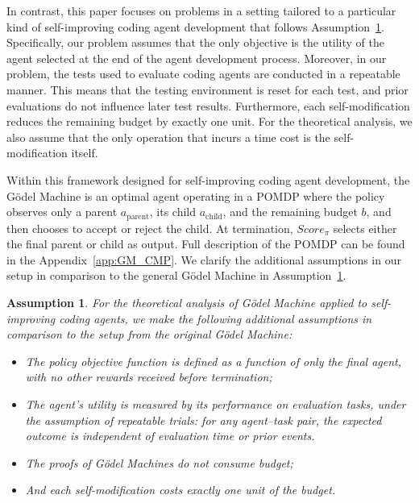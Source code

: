 \documentclass{article}
\newtheorem{assumption}{Assumption}
\begin{document}
In contrast, this paper focuses on problems in a setting tailored to a particular kind of self-improving coding agent development that follows Assumption~\ref{assumption:main}. 
Specifically, our problem assumes that the only objective is the utility of the agent selected at the end of the agent development process.
Moreover, in our problem, the tests used to evaluate coding agents are conducted in a repeatable manner. This means that the testing environment is reset for each test, and prior evaluations do not influence later test results. Furthermore, each self-modification reduces the remaining budget by exactly one unit. For the theoretical analysis, we also assume that the only operation that incurs a time cost is the self-modification itself.

Within this framework designed for self-improving coding agent development, the G\"odel Machine is an optimal agent operating in a POMDP where the policy observes only a parent $a_\text{parent}$, its child $a_\text{child}$, and the remaining budget $b$, and then chooses to accept or reject the child. At termination, $Score_\pi$  selects either the final parent or child as output. Full description of the POMDP can be found in the Appendix~\ref{app:GM_CMP}. We clarify the additional assumptions in our setup in comparison to the general G\"odel Machine in Assumption~\ref{assumption:main}.



\begin{assumption}\label{assumption:main}
For the theoretical analysis of G\"odel Machine applied to self-improving coding agents, we make the following additional assumptions in comparison to the setup from the original G\"odel Machine:
\begin{itemize}
    \item The policy objective function is defined as a function of only the final agent, with no other rewards received before termination;
    \item The agent’s utility is measured by its performance on evaluation tasks, under the assumption of repeatable trials: for any agent–task pair, the expected outcome is independent of evaluation time or prior events.
    \item The proofs of G\"odel Machines do not consume budget;
    \item And each self-modification costs exactly one unit of the budget.
\end{itemize}
\end{assumption}
\end{document}
